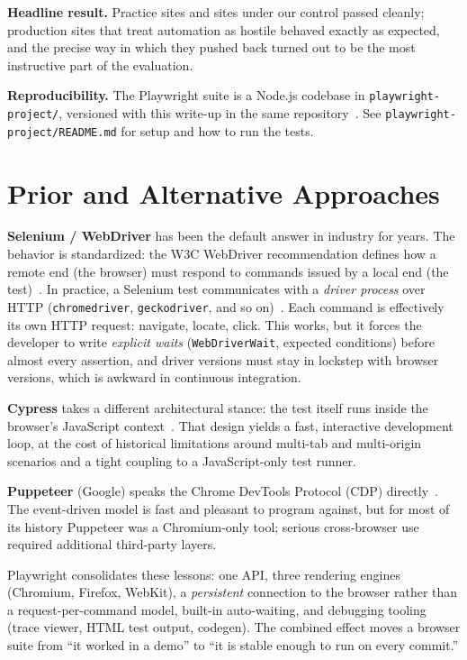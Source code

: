 \documentclass[12pt,letterpaper]{article}
\newcommand{\code}[1]{\texttt{#1}}
\begin{document}
\textbf{Headline result.} Practice sites and sites under our control passed cleanly; production sites that treat automation as hostile behaved exactly as expected, and the precise way in which they pushed back turned out to be the most instructive part of the evaluation.

\textbf{Reproducibility.} The Playwright suite is a Node.js codebase in \code{playwright-project/}, versioned with this write-up in the same repository~\cite{grouprepo}. See \texttt{playwright-project/README.md} for setup and how to run the tests.

\section{Prior and Alternative Approaches}

\textbf{Selenium / WebDriver} has been the default answer in industry for years. The behavior is standardized: the W3C WebDriver recommendation defines how a remote end (the browser) must respond to commands issued by a local end (the test)~\cite{w3cwd}. In practice, a Selenium test communicates with a \emph{driver process} over HTTP (\code{chromedriver}, \code{geckodriver}, and so on)~\cite{selenium}. Each command is effectively its own HTTP request: navigate, locate, click. This works, but it forces the developer to write \emph{explicit waits} (\code{WebDriverWait}, expected conditions) before almost every assertion, and driver versions must stay in lockstep with browser versions, which is awkward in continuous integration.

\textbf{Cypress} takes a different architectural stance: the test itself runs inside the browser's JavaScript context~\cite{cypress}. That design yields a fast, interactive development loop, at the cost of historical limitations around multi-tab and multi-origin scenarios and a tight coupling to a JavaScript-only test runner.

\textbf{Puppeteer} (Google) speaks the Chrome DevTools Protocol (CDP) directly~\cite{puppeteer}. The event-driven model is fast and pleasant to program against, but for most of its history Puppeteer was a Chromium-only tool; serious cross-browser use required additional third-party layers.

Playwright consolidates these lessons: one API, three rendering engines (Chromium, Firefox, WebKit), a \emph{persistent} connection to the browser rather than a request-per-command model, built-in auto-waiting, and debugging tooling (trace viewer, HTML test output, codegen). The combined effect moves a browser suite from ``it worked in a demo'' to ``it is stable enough to run on every commit.''
\end{document}
